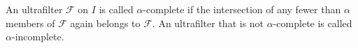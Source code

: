 An ultrafilter $\mathcal{F}$ on $I$ is called $\alpha$-complete if the intersection of any fewer than $\alpha$ members of $\mathcal{F}$ again belongs to $\mathcal{F}$. An ultrafilter that is not $\alpha$-complete is called $\alpha$-incomplete.
